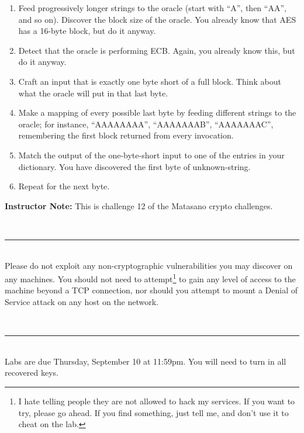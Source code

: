 \documentclass[11pt,oneside]{article}
\newcommand{\sectionfont}{phv} %
\renewcommand{\section}[1] {
    \vspace{12pt}{\quad\fontfamily{\sectionfont}\selectfont\Large\scshape\textbf{#1}}\\[-10pt]
    \vspace{8pt}\rule{\textwidth}{1pt}\\[-16pt]

}
\begin{document}
\begin{enumerate}
	\item Feed progressively longer strings to the oracle (start with ``A'',
		then ``AA'', and so on). Discover the block size of the oracle. You
		already know that AES has a 16-byte block, but do it anyway.
	
	\item Detect that the oracle is performing ECB. Again, you already know
		this, but do it anyway.
	
	\item Craft an input that is exactly one byte short of a full block. Think
		about what the oracle will put in that last byte.

	\item Make a mapping of every possible last byte by feeding different
		strings to the oracle; for instance, ``AAAAAAAA'', ``AAAAAAAB'',
		``AAAAAAAC'', remembering the first block returned from every
		invocation.
	
	\item Match the output of the one-byte-short input to one of the entries in
		your dictionary. You have discovered the first byte of unknown-string.
	
	\item Repeat for the next byte.
\end{enumerate}

\ifinstructornotes
\textbf{Instructor Note:} This is challenge 12 of the Matasano crypto
challenges.
\fi

\section{Rules}

Please do not exploit any non-cryptographic vulnerabilities you may discover on
any machines. You should not need to attempt\footnote{I hate telling people they
are not allowed to hack my services. If you want to try, please go ahead. If you
find something, just tell me, and don't use it to cheat on the lab.} to gain any
level of access to the machine beyond a TCP connection, nor should you attempt
to mount a Denial of Service attack on any host on the network.

\section{Grading}
Labs are due Thursday, September 10 at 11:59pm. You will need to turn in all
recovered keys.
\end{document}
